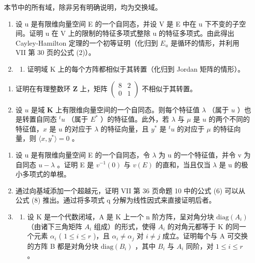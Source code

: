 \BourbakiExerciseGroup

本节中的所有域，除非另有明确说明，均为交换域。

\begin{enumerate}
\def\labelenumi{\arabic{enumi})}
\item
  设 u 是有限维向量空间 E 的一个自同态，并设 V 是 E 中在 u 下不变的子空间。证明 u 在 V 上的限制的特征多项式整除 u 的特征多项式。由此得出 Cayley-Hamilton 定理的一个初等证明（化归到 \(E_{u}\) 是循环的情形，并利用 VII 第 30 页的公式 (2)）。
\item
  \begin{enumerate}
  \def\labelenumii{\alph{enumii})}
  \tightlist
  \item
    证明域 K 上的每个方阵都相似于其转置（化归到 Jordan 矩阵的情形）。
  \end{enumerate}
\end{enumerate}

\begin{enumerate}
\def\labelenumi{\alph{enumi})}
\setcounter{enumi}{1}
\item
  证明在有理整数环 \(\mathbf{Z}\) 上，矩阵 \(\begin{pmatrix} 8 & 2 \\ 0 & 1 \end{pmatrix}\) 不相似于其转置。
\item
  设 \(u\) 是域 \(\mathbf{K}\) 上有限维向量空间的一个自同态。则每个特征值 \(\lambda\) （属于 \(u\) ）也是转置自同态 \(^t u\) （属于 \(E^*\) ）的特征值。此外，若 \(\lambda\) 与 \(\mu\) 是 \(u\) 的两个不同的特征值，\(x\) 是 \(u\) 的对应于 \(\lambda\) 的特征向量，且 \(y^*\) 是 \(^t u\) 的对应于 \(\mu\) 的特征向量，则 \(\langle x, y^* \rangle = 0\) 。
\end{enumerate}

\begin{enumerate}
\def\labelenumi{\arabic{enumi})}
\setcounter{enumi}{2}
\item
  设 u 是有限维向量空间 E 的一个自同态，令 \(\lambda\) 为 u 的一个特征值，并令 v 为自同态 \(u - \lambda\) 。证明 E 是 \(v^{-1}(0)\) 与 \(v(E)\) 的直和，当且仅当 \(\lambda\) 是 u 的极小多项式的单根。
\item
  通过向基域添加一个超越元，证明 VII 第 36 页命题 10 中的公式 (6) 可以从公式 (8) 推出。通过将多项式 q 分解为线性因式来直接证明后者。
\item
  \begin{enumerate}
  \def\labelenumii{\alph{enumii})}
  \tightlist
  \item
    设 K 是一个代数闭域，A 是 K 上一个 n 阶方阵，呈对角分块 \(\text{diag}(A_i)\) （由诸下三角矩阵 \(A_i\) 组成）的形式，使得 \(A_i\) 的对角元都等于 K 的同一个元素 \(\alpha_i\) ( \(1 \leqslant i \leqslant r\) )，且 \(\alpha_i \neq \alpha_j\) 对 \(i \neq j\) 成立。证明每个与 A 可交换的方阵 B 都是对角分块 \(\text{diag}(B_i)\) ，其中 \(B_i\) 与 \(A_i\) 同阶，对 \(1 \leqslant i \leqslant r\) 。
  \end{enumerate}
\end{enumerate}

